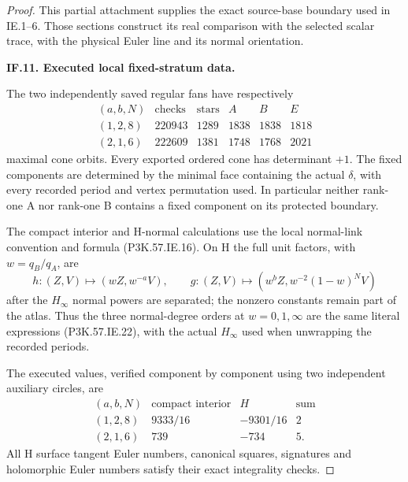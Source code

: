 \begin{proof}
This partial attachment supplies the exact source-base boundary used in
IE.1--6. Those sections construct its real comparison with the selected
scalar trace, with the physical Euler line and its normal orientation.

\par\medskip\noindent\textbf{IF.11. Executed local fixed-stratum data.}\par\nopagebreak[4]

The two independently saved regular fans have respectively
\[
 \begin{array}{c|r|r|rrr}
 (a,b,N)&\text{checks}&\text{stars}&A&B&E\\ \hline
 (1,2,8)&220943&1289&1838&1838&1818\\
 (2,1,6)&222609&1381&1748&1768&2021
 \end{array}
\]
maximal cone orbits. Every exported ordered cone has determinant \(+1\).
The fixed components are determined by the minimal face containing
the actual \(\delta\), with every recorded period and vertex
permutation used. In particular neither rank-one A nor rank-one B
contains a fixed component on its protected boundary.

The compact interior and H-normal calculations use the local
normal-link convention and formula (P3K.57.IE.16). On H the full unit
factors, with \(w=q_B/q_A\), are
\[
 h:(Z,V)\mapsto(wZ,w^{-a}V),\qquad
 g:(Z,V)\mapsto(w^bZ,w^{-2}(1-w)^NV)
\]
after the \(H_\infty\) normal powers are separated; the nonzero
constants remain part of the atlas. Thus the three normal-degree
orders at \(w=0,1,\infty\) are the same literal expressions
(P3K.57.IE.22), with the actual \(H_\infty\) used when unwrapping
the recorded periods.

The executed values, verified component by component using two
independent auxiliary circles, are
\[
 \begin{array}{c|rrr}
 (a,b,N)&\text{compact interior}&H&\text{sum}\\ \hline
 (1,2,8)&9333/16&-9301/16&2\\
 (2,1,6)&739&-734&5 .
 \end{array}                                           \tag{P3K.57.IF.32}
\]
All H surface tangent Euler numbers, canonical squares,
signatures and holomorphic Euler numbers satisfy their exact
integrality checks.


\end{proof}
